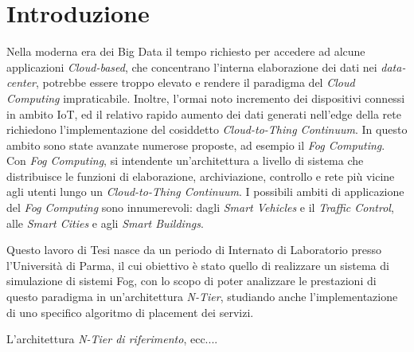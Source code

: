 \chapter*{Introduzione} %
\markboth{}{}

Nella moderna era dei Big Data il tempo richiesto per accedere ad alcune applicazioni \textit{Cloud-based}, che concentrano l'interna elaborazione dei dati nei \textit{data-center}, potrebbe essere troppo elevato e rendere il paradigma del \textit{Cloud Computing} impraticabile. Inoltre, l'ormai noto incremento dei dispositivi connessi in ambito IoT, ed il relativo rapido aumento dei dati generati nell'edge della rete richiedono l'implementazione del cosiddetto \textit{Cloud-to-Thing Continuum}. In questo ambito sono state avanzate numerose proposte, ad esempio il \textit{Fog Computing}. Con \textit{Fog Computing}, si intendente un'architettura a livello di sistema che distribuisce le funzioni di elaborazione, archiviazione, controllo e rete più vicine agli utenti lungo un \textit{Cloud-to-Thing Continuum}. I possibili ambiti di applicazione del \textit{Fog Computing} sono innumerevoli: dagli \textit{Smart Vehicles} e il \textit{Traffic Control}, alle \textit{Smart Cities} e agli \textit{Smart Buildings}.

Questo lavoro di Tesi nasce da un periodo di Internato di Laboratorio presso l'Università di Parma, il cui obiettivo è stato quello di realizzare un sistema di simulazione di sistemi Fog, con lo scopo di poter analizzare le prestazioni di questo paradigma in un'architettura \textit{N-Tier}, studiando anche l'implementazione di uno specifico algoritmo di placement dei servizi.

L'architettura \textit{N-Tier di riferimento}, ecc....